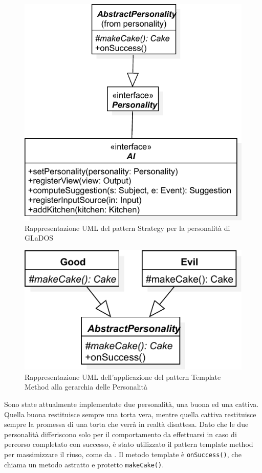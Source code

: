 \documentclass[a4paper,12pt]{report}
\begin{document}
\begin{figure}[h]
\centering{}
\includegraphics[width=\textwidth]{img/strategy}
\caption{Rappresentazione UML del pattern Strategy per la personalità di GLaDOS}
\label{img:strategy}
\end{figure}

\begin{figure}[h]
\centering{}
\includegraphics[width=\textwidth]{img/template}
\caption{Rappresentazione UML dell'applicazione del pattern Template Method alla gerarchia delle Personalità}
\label{img:template}
\end{figure}

Sono state attualmente implementate due personalità, una buona ed una cattiva.
Quella buona restituisce sempre una torta vera, mentre quella cattiva restituisce sempre la
promessa di una torta che verrà in realtà disattesa.
Dato che le due personalità differiscono solo per il comportamento da effettuarsi in caso di percorso completato con successo, è stato utilizzato il pattern template method per massimizzare il riuso, come da .
Il metodo template è \texttt{onSuccess()}, che chiama un metodo astratto e protetto
\texttt{makeCake()}.
\end{document}
